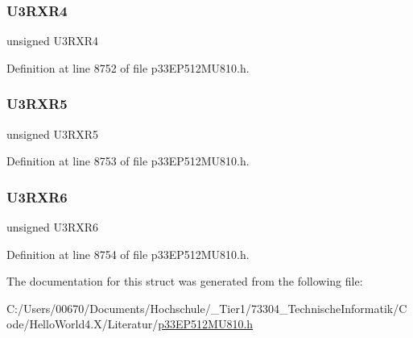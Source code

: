 \subsubsection{\texorpdfstring{U3\+R\+X\+R4}{U3RXR4}}
{\footnotesize\ttfamily unsigned U3\+R\+X\+R4}



Definition at line 8752 of file p33\+E\+P512\+M\+U810.\+h.

\mbox{\label{structtag_r_p_i_n_r27_b_i_t_s_a71a8b2e52b38c0486ec6d0c5b05e8389}} 
\subsubsection{\texorpdfstring{U3\+R\+X\+R5}{U3RXR5}}
{\footnotesize\ttfamily unsigned U3\+R\+X\+R5}



Definition at line 8753 of file p33\+E\+P512\+M\+U810.\+h.

\mbox{\label{structtag_r_p_i_n_r27_b_i_t_s_ae82133520034a2ece85501ecb628967b}} 
\subsubsection{\texorpdfstring{U3\+R\+X\+R6}{U3RXR6}}
{\footnotesize\ttfamily unsigned U3\+R\+X\+R6}



Definition at line 8754 of file p33\+E\+P512\+M\+U810.\+h.



The documentation for this struct was generated from the following file\+:\begin{DoxyCompactItemize}
\item 
C\+:/\+Users/00670/\+Documents/\+Hochschule/\+\_\+\+Tier1/73304\+\_\+\+Technische\+Informatik/\+Code/\+Hello\+World4.\+X/\+Literatur/\hyperlink{p33_e_p512_m_u810_8h}{p33\+E\+P512\+M\+U810.\+h}\end{DoxyCompactItemize}
